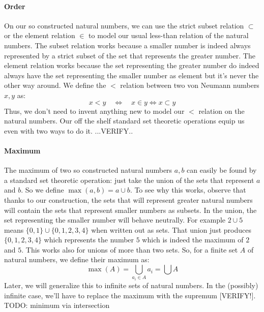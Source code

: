 \paragraph{Order}
On our so constructed natural numbers, we can use the strict subset relation $\subset$ or the element relation $\in$ to model our usual less-than relation of the natural numbers. The subset relation works because a smaller number is indeed always represented by a strict subset of the set that represents the greater number. The element relation works because the set representing the greater number do indeed always have the set representing the smaller number as element but it's never the other way around. We define the $<$ relation between two von Neumann numbers $x,y$ as:
\begin{equation}
x < y  \quad \Leftrightarrow \quad x \in y \Leftrightarrow x \subset y
\end{equation}
Thus, we don't need to invent anything new to model our $<$ relation on the natural numbers. Our off the shelf standard set theoretic operations equip us even with two ways to do it. ...VERIFY..


\paragraph{Maximum}
The maximum of two so constructed natural numbers $a,b$ can easily be found by a standard set theoretic operation: just take the union of the sets that represent $a$ and $b$. So we define $\max(a,b) = a \cup b$. To see why this works, observe that thanks to our construction, the sets that will represent greater natural numbers will contain the sets that represent smaller numbers as subsets. In the union, the set representing the smaller number will behave neutrally. For example $2 \cup 5$ means $\{0,1\} \cup \{0,1,2,3,4\}$ when written out as sets. That union just produces $\{0,1,2,3,4\}$ which represents the number $5$ which is indeed the maximum of $2$ and $5$. This works also for unions of more than two sets. So, for a finite set $A$ of natural numbers, we define their maximum as:
\begin{equation}
\max(A) = \bigcup_{a_i \in A} a_i = \bigcup A
\end{equation}
Later, we will generalize this to infinite sets of natural numbers. In the (possibly) infinite case, we'll have to replace the maximum with the supremum [VERIFY!]. TODO: minimum via intersection

